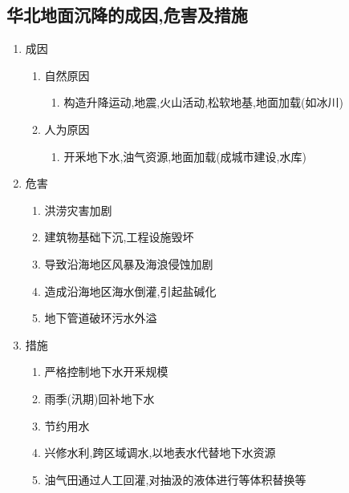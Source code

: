 \documentclass[a4paper]{article}
\begin{document}
    \subsection{华北地面沉降的成因,危害及措施}
    \begin{enumerate}
        \item 成因
        \begin{enumerate}
            \item 自然原因
            \begin{enumerate}
                \item 构造升降运动,地震,火山活动,松软地基,地面加载(如冰川)
            \end{enumerate}
            \item 人为原因
            \begin{enumerate}
                \item 开釆地下水,油气资源,地面加载(成城市建设,水库)
            \end{enumerate}
        \end{enumerate}
        \item 危害
        \begin{enumerate}
            \item 洪涝灾害加剧
            \item 建筑物基础下沉,工程设施毁坏
            \item 导致沿海地区风暴及海浪侵蚀加剧
            \item 造成沿海地区海水倒灌,引起盐碱化
            \item 地下管道破环污水外溢
        \end{enumerate}
        \item 措施
        \begin{enumerate}
            \item 严格控制地下水开釆规模
            \item 雨季(汛期)回补地下水
            \item 节约用水
            \item 兴修水利,跨区域调水,以地表水代替地下水资源
            \item 油气田通过人工回灌,对抽汲的液体进行等体积替换等
        \end{enumerate}
    \end{enumerate}
\end{document}

